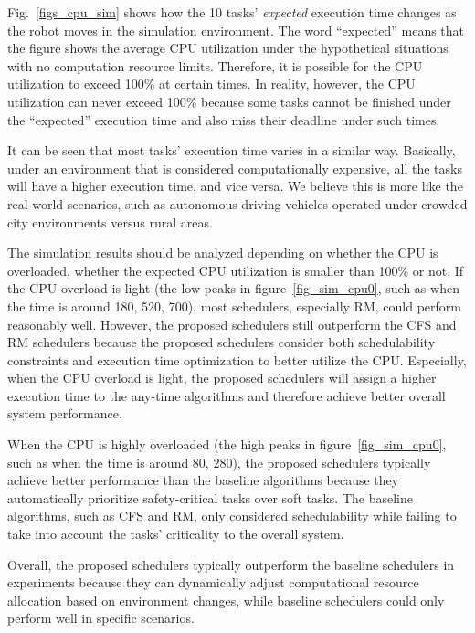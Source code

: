    \label{section: simulation_exp}

    Fig.~\ref{figs_cpu_sim} shows how the 10 tasks' \textit{expected} execution time changes as the robot moves in the simulation environment.
    The word ``expected'' means that the figure shows the average CPU utilization under the hypothetical situations with no computation resource limits. Therefore, it is possible for the CPU utilization to exceed 100\% at certain times. In reality, however, the CPU utilization can never exceed 100\% because some tasks cannot be finished under the ``expected'' execution time and also miss their deadline under such times.

    It can be seen that most tasks' execution time varies in a similar way. Basically, under an environment that is considered computationally expensive, all the tasks will have a higher execution time, and vice versa. We believe this is more like the real-world scenarios, such as autonomous driving vehicles operated under crowded city environments versus rural areas.

    The simulation results should be analyzed depending on whether the CPU is overloaded, \ie whether the expected CPU utilization is smaller than 100\% or not. If the CPU overload is light (\eg the low peaks in figure~\ref{fig_sim_cpu0}, such as when the time is around 180, 520, 700), most schedulers, especially RM, could perform reasonably well. However, the proposed schedulers still outperform the CFS and RM schedulers because the proposed schedulers consider both schedulability constraints and execution time optimization to better utilize the CPU. Especially, when the CPU overload is light, the proposed schedulers will assign a higher execution time to the any-time algorithms and therefore achieve better overall system performance.

    When the CPU is highly overloaded (\eg the high peaks in figure~\ref{fig_sim_cpu0}, such as when the time is around 80, 280), the proposed schedulers typically achieve better performance than the baseline algorithms because they automatically prioritize safety-critical tasks over soft tasks. The baseline algorithms, such as CFS and RM, only considered schedulability while failing to take into account the tasks' criticality to the overall system.

    Overall, the proposed schedulers typically outperform the baseline schedulers in experiments because they can dynamically adjust computational resource allocation based on environment changes, while baseline schedulers could only perform well in specific scenarios.

	
        